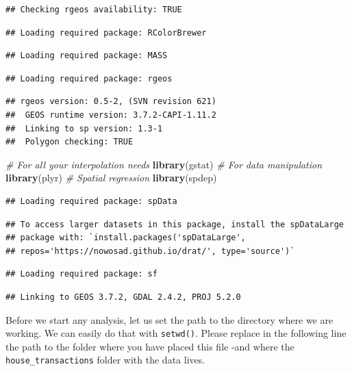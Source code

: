 \documentclass[]{book}
\newenvironment{Shaded}{\begin{snugshade}}{\end{snugshade}}
\newcommand{\KeywordTok}[1]{\textcolor[rgb]{0.13,0.29,0.53}{\textbf{#1}}}
\newcommand{\CommentTok}[1]{\textcolor[rgb]{0.56,0.35,0.01}{\textit{#1}}}
\newcommand{\NormalTok}[1]{#1}
\begin{document}
\begin{verbatim}
## Checking rgeos availability: TRUE
\end{verbatim}

\begin{verbatim}
## Loading required package: RColorBrewer
\end{verbatim}

\begin{verbatim}
## Loading required package: MASS
\end{verbatim}

\begin{verbatim}
## Loading required package: rgeos
\end{verbatim}

\begin{verbatim}
## rgeos version: 0.5-2, (SVN revision 621)
##  GEOS runtime version: 3.7.2-CAPI-1.11.2 
##  Linking to sp version: 1.3-1 
##  Polygon checking: TRUE
\end{verbatim}

\begin{Shaded}
\begin{Highlighting}[]
\CommentTok{# For all your interpolation needs}
\KeywordTok{library}\NormalTok{(gstat)}
\CommentTok{# For data manipulation}
\KeywordTok{library}\NormalTok{(plyr)}
\CommentTok{# Spatial regression}
\KeywordTok{library}\NormalTok{(spdep)}
\end{Highlighting}
\end{Shaded}

\begin{verbatim}
## Loading required package: spData
\end{verbatim}

\begin{verbatim}
## To access larger datasets in this package, install the spDataLarge
## package with: `install.packages('spDataLarge',
## repos='https://nowosad.github.io/drat/', type='source')`
\end{verbatim}

\begin{verbatim}
## Loading required package: sf
\end{verbatim}

\begin{verbatim}
## Linking to GEOS 3.7.2, GDAL 2.4.2, PROJ 5.2.0
\end{verbatim}

Before we start any analysis, let us set the path to the directory where
we are working. We can easily do that with \texttt{setwd()}. Please
replace in the following line the path to the folder where you have
placed this file -and where the \texttt{house\_transactions} folder with
the data lives.
\end{document}
